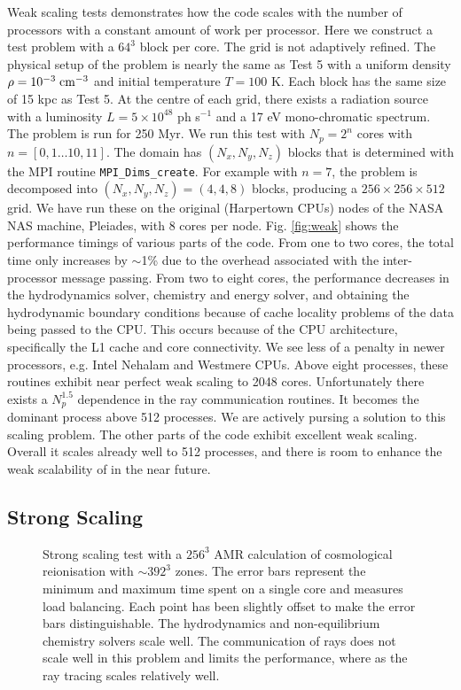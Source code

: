 \documentclass[useAMS,usenatbib]{mn2e}
\begin{document}
Weak scaling tests demonstrates how the code scales with the number of
processors with a constant amount of work per processor.  Here we
construct a test problem with a $64^3$ block per core.  The grid is
not adaptively refined.  The physical setup of the problem is nearly
the same as Test 5 with a uniform density $\rho = 10^{-3} \;\cubecm$
and initial temperature $T = 100$ K.  Each block has the same size of
15 kpc as Test 5.  At the centre of each grid, there exists a
radiation source with a luminosity $L = 5 \times 10^{48}$ ph s$^{-1}$
and a 17 eV mono-chromatic spectrum.  The problem is run for 250 Myr.
We run this test with $N_p = 2^n$ cores with $n = [0,1 \dots 10,11]$.
The domain has $(N_x, N_y, N_z)$ blocks that is determined with the
MPI routine \texttt{MPI\_Dims\_create}.  For example with $n = 7$, the
problem is decomposed into $(N_x, N_y, N_z) = (4,4,8)$ blocks,
producing a $256 \times 256 \times 512$ grid.  We have run these on
the original (Harpertown CPUs) nodes of the NASA NAS machine,
Pleiades, with 8 cores per node.  Fig. \ref{fig:weak} shows the
performance timings of various parts of the code.  From one to two
cores, the total time only increases by $\sim$1\% due to the overhead
associated with the inter-processor message passing.  From two to
eight cores, the performance decreases in the hydrodynamics solver,
chemistry and energy solver, and obtaining the hydrodynamic boundary
conditions because of cache locality problems of the data being passed
to the CPU.  This occurs because of the CPU architecture, specifically
the L1 cache and core connectivity.  We see less of a penalty in newer
processors, e.g. Intel Nehalam and Westmere CPUs.  Above eight
processes, these routines exhibit near perfect weak scaling to 2048
cores.  Unfortunately there exists a $N_p^{1.5}$ dependence in the ray
communication routines.  It becomes the dominant process above 512
processes.  We are actively pursing a solution to this scaling
problem.  The other parts of the code exhibit excellent weak scaling.
Overall it scales already well to 512 processes, and there is room to
enhance the weak scalability of \moray in the near future.

\subsection{Strong Scaling}
\label{sec:strong_sc}

\begin{figure}
  \caption{\label{fig:strong} Strong scaling test with a $256^3$ AMR
    calculation of cosmological reionisation with $\sim392^3$ zones.
    The error bars represent the minimum and maximum time spent on a
    single core and measures load balancing.  Each point has been
    slightly offset to make the error bars distinguishable.  The
    hydrodynamics and non-equilibrium chemistry solvers scale well.
    The communication of rays does not scale well in this problem and
    limits the performance, where as the ray tracing scales relatively
    well.}
\end{figure}
\end{document}
